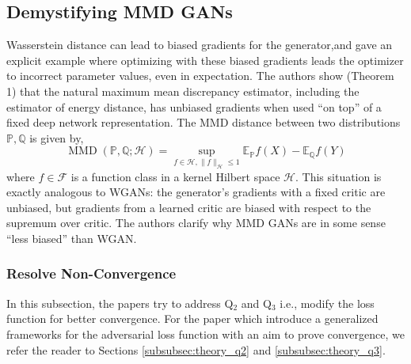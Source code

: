 \subsection*{Demystifying MMD GANs \citep{mmd}} Wasserstein distance can lead to biased gradients for the generator,and gave an explicit example where optimizing with these biased gradients leads the optimizer to incorrect parameter values, even in expectation. The authors show (Theorem 1) that the natural maximum mean discrepancy estimator, including the estimator of energy distance, has unbiased gradients when used “on top” of a fixed deep network representation. 
The MMD distance between two distributions $\mathbb{P}, \mathbb{Q}$ is given by,
$$
\operatorname{MMD}(\mathbb{P}, \mathbb{Q} ; \mathcal{H})=\sup _{f \in \mathcal{H},\|f\|_{\mathcal{H}} \leq 1} \mathbb{E}_{\mathbb{P}} f(X)-\mathbb{E}_{\mathbb{Q}} f(Y)
$$
where $f \in \mathcal{F}$ is a function class in a kernel Hilbert space $\mathcal{H}$. This situation is exactly analogous to WGANs: the generator’s gradients with a fixed critic are unbiased, but gradients from a learned critic are biased with respect to the supremum over critic. The authors clarify why MMD GANs are in some sense ``less biased'' than WGAN.

\subsubsection{Resolve Non-Convergence} 
\label{subsubsec:loss_nc}
In this subsection, the papers try to address Q$_2$ and Q$_3$ i.e., modify the loss function for better convergence. For the paper which introduce a generalized frameworks for the adversarial loss function with an aim to prove convergence, we refer the reader to Sections \ref{subsubsec:theory_q2} and \ref{subsubsec:theory_q3}.

